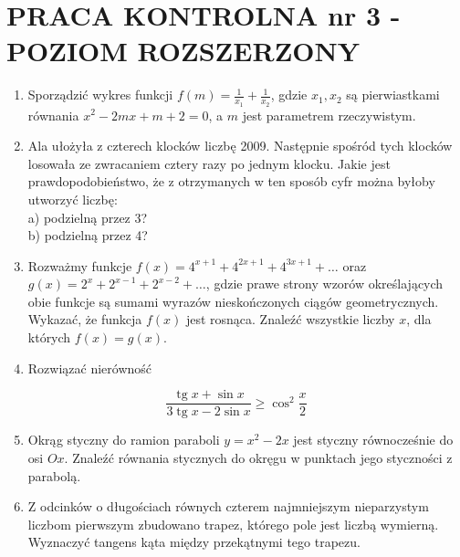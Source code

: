 \documentclass[10pt]{article}
\begin{document}
\section*{PRACA KONTROLNA nr 3 -POZIOM ROZSZERZONY}
\begin{enumerate}
  \item Sporządzić wykres funkcji $f(m)=\frac{1}{x_{1}}+\frac{1}{x_{2}}$, gdzie $x_{1}, x_{2}$ są pierwiastkami równania $x^{2}-2 m x+m+2=0$, a $m$ jest parametrem rzeczywistym.
  \item Ala ułożyła z czterech klocków liczbę 2009. Następnie spośród tych klocków losowała ze zwracaniem cztery razy po jednym klocku. Jakie jest prawdopodobieństwo, że z otrzymanych w ten sposób cyfr można byłoby utworzyć liczbę:\\
a) podzielną przez 3?\\
b) podzielną przez 4?
  \item Rozważmy funkcje $f(x)=4^{x+1}+4^{2 x+1}+4^{3 x+1}+\ldots$ oraz $g(x)=2^{x}+2^{x-1}+2^{x-2}+\ldots$, gdzie prawe strony wzorów określających obie funkcje są sumami wyrazów nieskończonych ciągów geometrycznych. Wykazać, że funkcja $f(x)$ jest rosnąca. Znaleźć wszystkie liczby $x$, dla których $f(x)=g(x)$.
  \item Rozwiązać nierówność
\end{enumerate}

$$
\frac{\operatorname{tg} x+\sin x}{3 \operatorname{tg} x-2 \sin x} \geqslant \cos ^{2} \frac{x}{2}
$$

\begin{enumerate}
  \setcounter{enumi}{4}
  \item Okrąg styczny do ramion paraboli $y=x^{2}-2 x$ jest styczny równocześnie do osi $O x$. Znaleźć równania stycznych do okręgu w punktach jego styczności z parabolą.
  \item Z odcinków o długościach równych czterem najmniejszym nieparzystym liczbom pierwszym zbudowano trapez, którego pole jest liczbą wymierną. Wyznaczyć tangens kąta między przekątnymi tego trapezu.
\end{enumerate}
\end{document}
